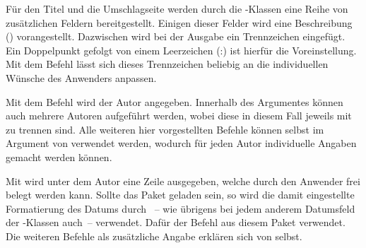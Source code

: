 \begin{Declaration}{}
\printdeclarationlist%
%
Für den Titel und die Umschlagseite werden durch die \TUDScript-Klassen
eine Reihe von zusätzlichen Feldern bereitgestellt. Einigen dieser Felder wird 
eine Beschreibung () vorangestellt. Dazwischen 
wird bei der Ausgabe ein Trennzeichen eingefügt. Ein Doppelpunkt gefolgt von 
einem Leerzeichen (:) ist hierfür die Voreinstellung. Mit 
dem Befehl  lässt sich dieses Trennzeichen beliebig an 
die individuellen Wünsche des Anwenders anpassen.
\end{Declaration}

\begin{Declaration}{}
\begin{Declaration}{}
\begin{Declaration}{}
\begin{Declaration}{}
\begin{Declaration}{}
\begin{Declaration}{}
\printdeclarationlist%
%
%
%
Mit dem Befehl  wird der Autor angegeben. Innerhalb des 
Argumentes können auch mehrere Autoren aufgeführt werden, wobei diese in diesem 
Fall jeweils mit  zu trennen sind. Alle weiteren hier vorgestellten 
Befehle können selbst im Argument von  verwendet werden, wodurch 
für jeden Autor individuelle Angaben gemacht werden können.

Mit  wird unter dem Autor eine Zeile ausgegeben, welche 
durch den Anwender frei belegt werden kann. Sollte das Paket  
geladen sein, so wird die damit eingestellte Formatierung des Datums durch 
~-- wie übrigens bei jedem anderem Datumsfeld der 
\TUDScript-Klassen auch~-- verwendet. Dafür der Befehl  aus 
diesem Paket verwendet. Die weiteren Befehle als zusätzliche Angabe erklären 
sich von selbst.
\end{Declaration}
\end{Declaration}
\end{Declaration}
\end{Declaration}
\end{Declaration}
\end{Declaration}

